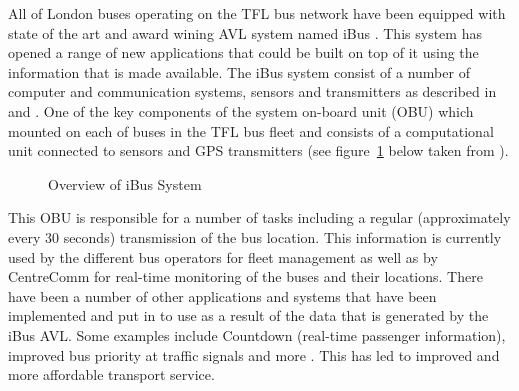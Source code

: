 
All of London buses operating on the TFL bus network have been equipped with state of the art and award wining \cite{ibusAward} AVL system named iBus \cite{ibus}. This system has opened a range of new applications that could be built on top of it using the information that is made available. The iBus system consist of a number of computer and communication systems, sensors and transmitters as described in \cite{Hounsell201276} and \cite{eps354267}.
One of the key components of the system on-board unit (OBU) which mounted on each of
buses in the TFL bus fleet and consists of a computational unit connected to
sensors and GPS transmitters (see figure~\ref{fig:iBusOverview} below taken from \cite{Hounsell201276}).
\begin{figure}[ht]
	\caption{Overview of iBus System \cite{Hounsell201276}}
	\label{fig:iBusOverview}
\end{figure}
This OBU is responsible for a number of tasks including a regular (approximately every 30 seconds) transmission of the bus location. This information is currently used by the different bus operators for fleet management as well as by CentreComm for real-time monitoring of the buses and their locations. There have been a number of other applications and systems that have been implemented and put in to use as a result of the data that is generated by the iBus AVL. Some examples include Countdown (real-time passenger information), improved bus priority at traffic signals and more \cite{Hounsell201276}. This has led to improved and more affordable transport service.

